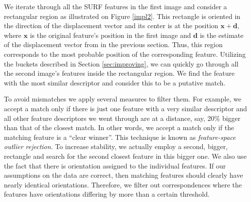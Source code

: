 We iterate through all the SURF features in the first image and consider a rectangular region as illustrated on Figure \ref{impl2}.
This rectangle is oriented in the direction of the displacement vector and its center is at the position $\mathbf{x} + \mathbf{d},$ where $\mathbf{x}$ is the original feature's position in the first image and $\mathbf{d}$ is the estimate of the displacement vector from in the previous section. 
Thus, this region corresponds to the most probable position of the corresponding feature. 
Utilizing the buckets described in Section \ref{sec:improving}, we can quickly go through all the second image's features inside the rectangular region. 
We find the feature with the most similar descriptor and consider this to be a putative match.

To avoid mismatches we apply several measures to filter them. 
For example, we accept a match only if there is just one feature with a very similar descriptor and all other feature descriptors we went through are at a distance, say, 20\% bigger than that of the closest match. 
In other words, we accept a match only if the matching feature is a ``clear winner''.
This technique is known as \textit{feature-space outlier rejection}.
To increase stability, we actually employ a second, bigger, rectangle and search for the second closest feature in this bigger one.
We also use the fact that there is orientation assigned to the individual features. 
If our assumptions on the data are correct, then matching features should clearly have nearly identical orientations. 
Therefore, we filter out correspondences where the features have orientations differing by more than a certain threshold. 


